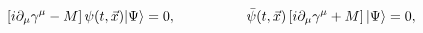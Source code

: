 \begin{equation}
\label{operator equationPsi}
\left[i \partial_{\mu}\gamma^{\mu} - M\right]\psi(t,{\vec x})
|\Psi \rangle = 0, \hspace{0.7in}
\bar{\psi}(t,{\vec x})\left[i \partial_{\mu}\gamma^{\mu} + M\right]
|\Psi \rangle = 0,
\end{equation}

